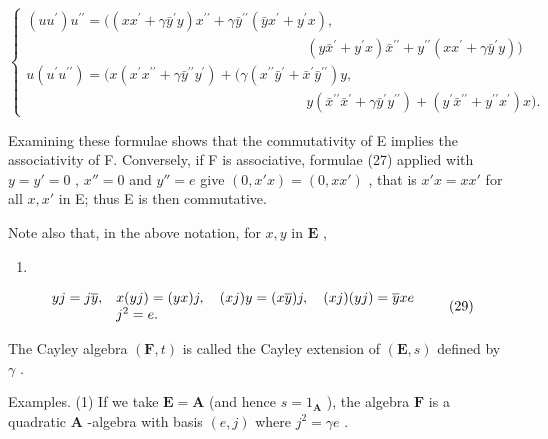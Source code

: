 \[
\left\{ \begin{array}{l} (u u ^ {\prime}) u ^ {\prime \prime} = ((x x ^ {\prime} + \gamma \bar {y} ^ {\prime} y) x ^ {\prime \prime} + \gamma \bar {y} ^ {\prime \prime} (\bar {y} x ^ {\prime} + y ^ {\prime} x), \\ \qquad \qquad \qquad \qquad \qquad \qquad \qquad \qquad \qquad \qquad (y \bar {x} ^ {\prime} + y ^ {\prime} x) \bar {x} ^ {\prime \prime} + y ^ {\prime \prime} (x x ^ {\prime} + \gamma \bar {y} ^ {\prime} y)) \\ u (u ^ {\prime} u ^ {\prime \prime}) = (x (x ^ {\prime} x ^ {\prime \prime} + \gamma \bar {y} ^ {\prime \prime} y ^ {\prime}) + (\gamma (x ^ {\prime \prime} \bar {y} ^ {\prime} + \bar {x} ^ {\prime} \bar {y} ^ {\prime \prime}) y, \\ \qquad \qquad \qquad \qquad \qquad \qquad \qquad \qquad \qquad \qquad y (\bar {x} ^ {\prime \prime} \bar {x} ^ {\prime} + \gamma \bar {y} ^ {\prime} y ^ {\prime \prime}) + (y ^ {\prime} \bar {x} ^ {\prime \prime} + y ^ {\prime \prime} x ^ {\prime}) x). \end{array} \right.\tag{27}
\]

Examining these formulae shows that the commutativity of E implies the associativity of F. Conversely, if F is associative, formulae (27) applied with \(y = y' = 0\) , \(x'' = 0\) and \(y'' = e\) give \((0, x'x) = (0, xx')\) , that is \(x'x = xx'\) for all \(x, x'\) in E; thus E is then commutative.

Note also that, in the above notation, for \(x, y\) in \(\mathbf{E}\) ,

\begin{enumerate}
\def\labelenumi{(\arabic{enumi})}
\setcounter{enumi}{27}
\tightlist
\item
\end{enumerate}

\[
\begin{array}{r l} y j = j \overline {{y}}, & x (y j) = (y x) j, \quad (x j) y = (x \overline {{y}}) j, \quad (x j) (y j) = \overline {{y}} x e \\ & j ^ {2} = e. \end{array}\tag{29}
\]

The Cayley algebra \((\mathbf{F}, t)\) is called the Cayley extension of \((\mathbf{E}, s)\) defined by \(\gamma\) .

Examples. (1) If we take \(\mathbf{E} = \mathbf{A}\) (and hence \(s = 1_{\mathbf{A}}\) ), the algebra \(\mathbf{F}\) is a quadratic \(\mathbf{A}\) -algebra with basis \((e,j)\) where \(j^2 = \gamma e\) .

